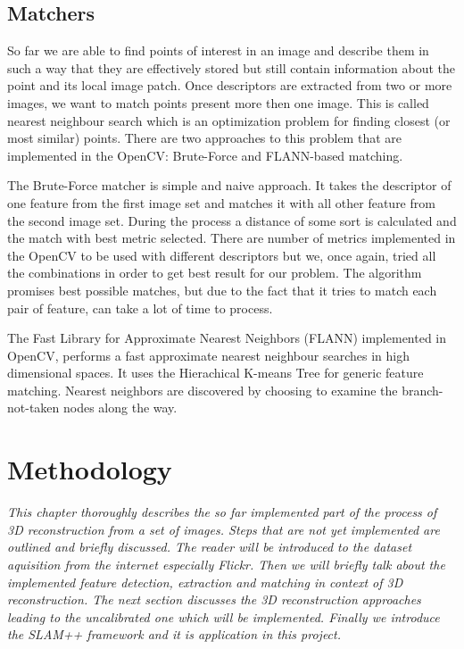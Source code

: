 \section{Matchers}
\label{sec:matchers}
So far we are able to find points of interest in an image and describe them in such a way that they are effectively stored but still contain information about the point and its local image patch. Once descriptors are extracted from two or more images, we want to match points present more then one image. This is called nearest neighbour search which is an optimization problem for finding closest (or most similar) points. There are two approaches to this problem that are implemented in the OpenCV: Brute-Force and FLANN-based matching.

The Brute-Force matcher is simple and naive approach. It takes the descriptor of one feature from the first image set and matches it with all other feature from the second image set. During the process a distance of some sort is calculated and the match with best metric selected. There are number of metrics implemented in the OpenCV to be used with different descriptors but we, once again, tried all the combinations in order to get best result for our problem. The algorithm promises best possible matches, but due to the fact that it tries to match each pair of feature, can take a lot of time to process. 

The Fast Library for Approximate Nearest Neighbors (FLANN) implemented in OpenCV, performs a fast approximate nearest neighbour searches in high dimensional spaces. It uses the Hierachical K-means Tree for generic feature matching. Nearest neighbors are discovered by choosing to examine the branch-not-taken nodes along the way. \cite{www:flann}

\chapter{Methodology}
\label{chapter:methodology}
\textit{This chapter thoroughly describes the so far implemented part of the process of 3D reconstruction from a set of images. Steps that are not yet implemented are outlined and briefly discussed. The reader will be introduced to the dataset aquisition from the internet especially Flickr. Then we will briefly talk about the implemented feature detection, extraction and matching in context of 3D reconstruction. The next section discusses the 3D reconstruction approaches leading to the uncalibrated one which will be implemented. Finally we introduce the SLAM++ framework and it is application in this project.}

